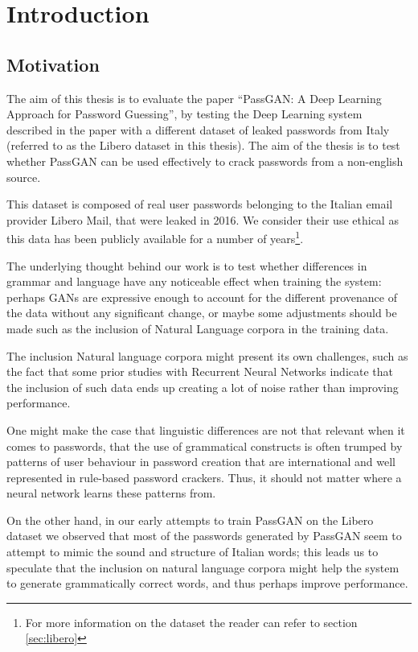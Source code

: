 \section{Introduction}\label{sec:introduction}
\subsection{Motivation}
The aim of this thesis is to evaluate the paper \enquote{PassGAN: A Deep Learning Approach for Password Guessing}\cite{PassGAN}, by testing the Deep Learning system described in the paper with a different dataset of leaked passwords from Italy\cite{libero_leak} (referred to as the Libero dataset in this thesis). The aim of the thesis is to test whether PassGAN can be used effectively to crack passwords from a non-english source.

This dataset is composed of real user passwords belonging to the Italian email provider Libero Mail, that were leaked in 2016. We consider their use ethical as this data has been publicly available for a number of years\footnote{For more information on the dataset the reader can refer to section \ref{sec:libero}}. 

The underlying thought behind our work is to test whether differences in grammar and language have any noticeable effect when training the system: perhaps GANs are expressive enough to account for the different provenance of the data without any significant change, or maybe some adjustments should be made such as the inclusion of Natural Language corpora in the training data. 

The inclusion Natural language corpora might present its own challenges, such as the fact that some prior studies with Recurrent Neural Networks indicate that the inclusion of such data ends up creating a lot of noise rather than improving performance\cite{Melicher2016}.

One might make the case that linguistic differences are not that relevant when it comes to passwords, that the use of grammatical constructs is often trumped by patterns of user behaviour in password creation that are international and well represented in rule-based password crackers. Thus, it should not matter where a neural network learns these patterns from.

On the other hand, in our early attempts to train PassGAN on the Libero dataset we observed that most of the passwords generated by PassGAN seem to attempt to mimic the sound and structure of Italian words; this leads us to speculate that the inclusion on natural language corpora might help the system to generate grammatically correct words, and thus perhaps improve performance.

